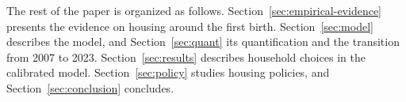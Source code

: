 

The rest of the paper is organized as follows. Section~\ref{sec:empirical-evidence}
presents the evidence on housing around the first birth.
Section~\ref{sec:model} describes the model, and Section~\ref{sec:quant} its
quantification and the transition from 2007 to 2023.
Section~\ref{sec:results} describes household choices in the calibrated model.
Section~\ref{sec:policy} studies housing policies, and
Section~\ref{sec:conclusion} concludes.
